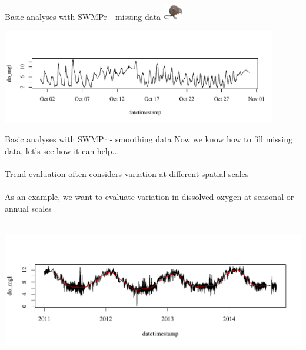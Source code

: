 \documentclass[xcolor=dvipsnames,serif]{beamer}\usepackage[]{graphicx}\usepackage[]{color}
\newenvironment{knitrout}{}{} %
\begin{document}
\begin{frame}[fragile]{Basic analyses with SWMPr - missing data \includegraphics[width = 0.065\textwidth]{imgs/swmprat.png}}
\begin{knitrout}
\end{knitrout}
\vspace{-0.5in}
\begin{knitrout}\scriptsize
{}\color{fgcolor}

{\centering \includegraphics[width=0.9\textwidth]{figure/unnamed-chunk-10-1} 

}



\end{knitrout}
\end{frame}

\begin{frame}[fragile]{Basic analyses with SWMPr - smoothing data}
Now we know how to fill missing data, let's see how it can help...\\~\\
Trend evaluation often considers variation at different spatial scales \\~\\
As an example, we want to evaluate variation in dissolved oxygen at seasonal or annual scales \\~\\
\begin{knitrout}\scriptsize
{}\color{fgcolor}

{\centering \includegraphics[width=\textwidth]{figure/unnamed-chunk-11-1} 

}



\end{knitrout}
\end{frame}
\end{document}
